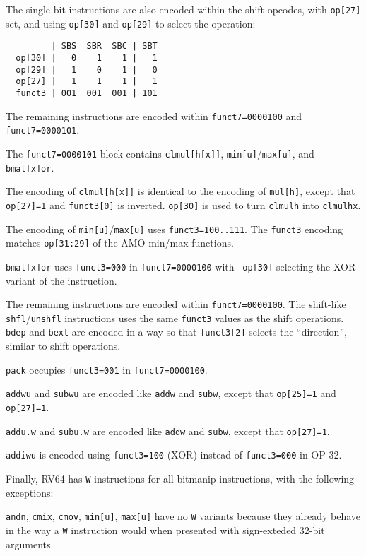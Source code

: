 The single-bit instructions are also encoded within the shift opcodes, with
{\tt op[27]} set, and using {\tt op[30]} and {\tt op[29]} to select the operation:

\begin{minipage}{\linewidth}
\begin{verbatim}
         | SBS  SBR  SBC | SBT
  op[30] |   0    1    1 |   1
  op[29] |   1    0    1 |   0
  op[27] |   1    1    1 |   1
  funct3 | 001  001  001 | 101
\end{verbatim}
\end{minipage}

The remaining instructions are encoded within {\tt funct7=0000100} and
{\tt funct7=0000101}.

The {\tt funct7=0000101} block contains {\tt clmul[h[x]]},
{\tt min[u]}/{\tt max[u]}, and {\tt bmat[x]or}.

The encoding of {\tt clmul[h[x]]} is identical to the encoding of {\tt mul[h]},
except that {\tt op[27]=1} and {\tt funct3[0]} is inverted. {\tt op[30]} is used
to turn {\tt clmulh} into {\tt clmulhx}.

The encoding of {\tt min[u]}/{\tt max[u]} uses {\tt funct3=100..111}. The
{\tt funct3} encoding matches {\tt op[31:29]} of the AMO min/max functions.

{\tt bmat[x]or} uses {\tt funct3=000} in {\tt funct7=0000100} with {\tt
op[30]} selecting the XOR variant of the instruction.

The remaining instructions are encoded within {\tt funct7=0000100}. The
shift-like {\tt shfl}/{\tt unshfl} instructions uses the same {\tt funct3}
values as the shift operations. {\tt bdep} and {\tt bext} are encoded in a
way so that {\tt funct3[2]} selects the ``direction'', similar to shift
operations.

{\tt pack} occupies {\tt funct3=001} in {\tt funct7=0000100}.

{\tt addwu} and {\tt subwu} are encoded like {\tt addw} and {\tt subw}, except
that {\tt op[25]=1} and {\tt op[27]=1}.

{\tt addu.w} and {\tt subu.w} are encoded like {\tt addw} and {\tt subw}, except
that {\tt op[27]=1}.

{\tt addiwu} is encoded using {\tt funct3=100} (XOR) instead of {\tt funct3=000} in OP-32.

Finally, RV64 has {\tt *W} instructions for all bitmanip instructions, with the
following exceptions:

{\tt andn}, {\tt cmix}, {\tt cmov}, {\tt min[u]}, {\tt max[u]} have no {\tt *W}
variants because they already behave in the way a {\tt *W} instruction would
when presented with sign-exteded 32-bit arguments.

